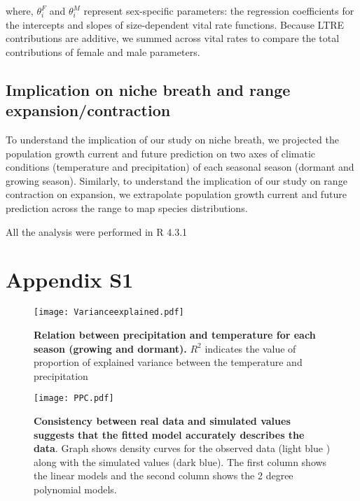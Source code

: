 \documentclass[11pt]{article}
\begin{document}
{\noindent where, $\theta^{F}_{i}$ and $\theta^{M}_{i}$ represent sex-specific parameters: the regression coefficients for the intercepts and slopes of size-dependent vital rate functions. 
Because LTRE contributions are additive, we summed across vital rates to compare the total contributions of female and male parameters. 
\subsection*{Implication on niche breath and range expansion/contraction}
To understand the implication of our study on niche breath, we projected the population growth current and future prediction on two axes of climatic conditions (temperature and precipitation) of each seasonal season (dormant and growing season). 
Similarly, to understand the implication of our study on range contraction on expansion, we extrapolate population growth current and future prediction across the range to map species distributions. 

All the analysis were performed in R 4.3.1 \citep{RCoreteam}


\section*{Appendix S1}
\renewcommand{\thefigure}{S\arabic{figure}}
	\setcounter{figure}{0}
	
		\renewcommand{\thetable}{S\arabic{table}}
	\setcounter{equation}{0}  %
	\setcounter{figure}{0}
	\setcounter{table}{0}
	
	
	\begin{figure}[H]
		\centering
		\texttt{[image: Varianceexplained.pdf]}
		\caption{\textbf{Relation between precipitation and temperature for each season (growing and dormant).} $R^2$ indicates the value of proportion of explained variance between the temperature and precipitation}
	\end{figure}
	
  \begin{figure}[H]
		\centering
		\texttt{[image: PPC.pdf]}
		\caption{\textbf{Consistency between real data and simulated values suggests that the fitted model accurately describes the data}. Graph shows density curves for the observed data (light blue ) along with the simulated values (dark blue). The first column shows the linear models and the second column shows the 2 degree polynomial models.}
	\end{figure}

}
\end{document}

